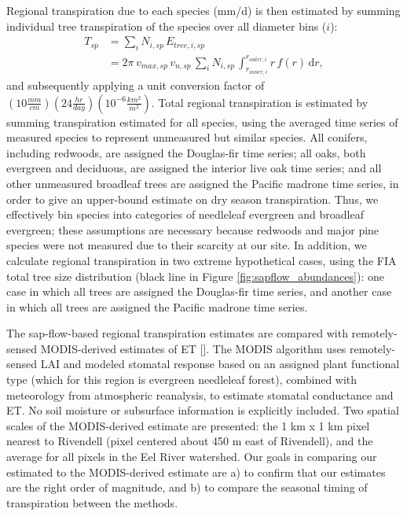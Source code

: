 Regional transpiration due to each species (mm/d) is then estimated by summing individual tree transpiration of the species over all diameter bins ($i$):
\begin{align}
\label{eqn:transpreg}
T_{sp} &= \sum_{i} N_{i,sp} \, E_{tree,i,sp} \nonumber \\
&= 2\pi \, v_{max,sp} \, v_{n,sp} \, \sum_{i} N_{i,sp} \, \int_{r_{inner,i}}^{r_{outer,i}}  r \, f(r) \, \mathrm{d}r ,
\end{align}
and subsequently applying a unit conversion factor of $(10 \tfrac{mm}{cm}) (24 \tfrac{hr}{day}) (10^{-6} \tfrac{km^2}{m^2})$.  Total regional transpiration is estimated by summing transpiration estimated for all species, using the averaged time series of measured species to represent unmeasured but similar species.  All conifers, including redwoods, are assigned the Douglas-fir time series; all oaks, both evergreen and deciduous, are assigned the interior live oak time series; and all other unmeasured broadleaf trees are assigned the Pacific madrone time series, in order to give an upper-bound estimate on dry season transpiration.  Thus, we effectively bin species into categories of needleleaf evergreen and broadleaf evergreen; these assumptions are necessary because redwoods and major pine species were not measured due to their scarcity at our site.  In addition, we calculate regional transpiration in two extreme hypothetical cases, using the FIA total tree size distribution (black line in Figure \ref{fig:sapflow_abundances}): one case in which all trees are assigned the Douglas-fir time series, and another case in which all trees are assigned the Pacific madrone time series. 

The sap-flow-based regional transpiration estimates are compared with remotely-sensed MODIS-derived estimates of ET [\cite{mu2007development}].  The MODIS algorithm uses remotely-sensed LAI and modeled stomatal response based on an assigned plant functional type (which for this region is evergreen needleleaf forest), combined with meteorology from atmospheric reanalysis, to estimate stomatal conductance and ET.  No soil moisture or subsurface information is explicitly included.  Two spatial scales of the MODIS-derived estimate are presented: the 1 km x 1 km pixel nearest to Rivendell (pixel centered about 450 m east of Rivendell), and the average for all pixels in the Eel River watershed.  Our goals in comparing our estimated to the MODIS-derived estimate are a) to confirm that our estimates are the right order of magnitude, and b) to compare the seasonal timing of transpiration between the methods.

